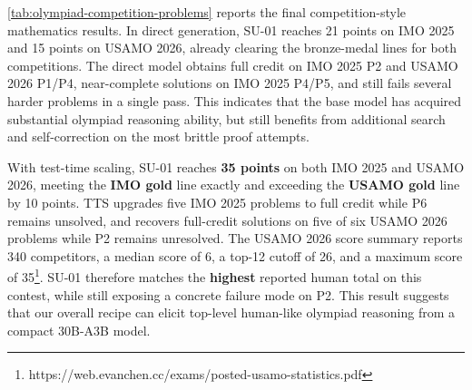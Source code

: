 \cref{tab:olympiad-competition-problems} reports the final competition-style
mathematics results. In direct generation, SU-01 reaches 21 points on IMO 2025
and 15 points on USAMO 2026, already clearing the bronze-medal lines for both
competitions. 
The direct
model obtains full credit on IMO 2025 P2 and USAMO 2026 P1/P4, near-complete
solutions on IMO 2025 P4/P5, and still fails several harder problems in a
single pass. 
This indicates that the base model has acquired substantial
olympiad reasoning ability, but still benefits from additional search and
self-correction on the most brittle proof attempts.

With test-time scaling, SU-01 reaches \textbf{35 points} on both IMO 2025 and USAMO 2026, meeting the \textbf{IMO gold} line exactly and exceeding the \textbf{USAMO gold} line by 10
points. TTS upgrades five IMO 2025 problems to full credit while P6 remains unsolved, and recovers full-credit solutions on five of six USAMO 2026 problems while
P2 remains unresolved. The USAMO 2026 score summary reports 340 competitors, a median score of 6, a top-12 cutoff of 26, and a maximum score of 35\footnote{https://web.evanchen.cc/exams/posted-usamo-statistics.pdf}. 
SU-01
therefore matches the \textbf{highest} reported human total on this contest, while still exposing a concrete failure mode on P2. 
This result suggests that our overall
recipe can elicit top-level human-like olympiad reasoning from a compact 30B-A3B model.


